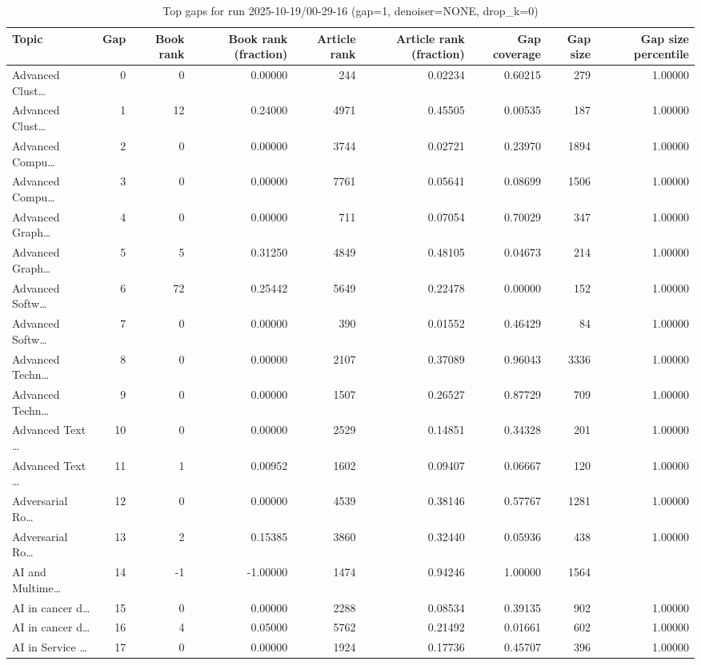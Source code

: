 \begin{table}
\caption{Top gaps for run 2025-10-19/00-29-16 (gap=1, denoiser=NONE, drop\_k=0)}
\label{tab:best_run_gap1_2025_10_19_00_29_16}
\begin{tabular}{lrrrrrrrr}
\toprule
Topic & Gap & Book rank & Book rank (fraction) & Article rank & Article rank (fraction) & Gap coverage & Gap size & Gap size percentile \\
\midrule
Advanced Clust… & 0 & 0 & 0.00000 & 244 & 0.02234 & 0.60215 & 279 & 1.00000 \\
Advanced Clust… & 1 & 12 & 0.24000 & 4971 & 0.45505 & 0.00535 & 187 & 1.00000 \\
Advanced Compu… & 2 & 0 & 0.00000 & 3744 & 0.02721 & 0.23970 & 1894 & 1.00000 \\
Advanced Compu… & 3 & 0 & 0.00000 & 7761 & 0.05641 & 0.08699 & 1506 & 1.00000 \\
Advanced Graph… & 4 & 0 & 0.00000 & 711 & 0.07054 & 0.70029 & 347 & 1.00000 \\
Advanced Graph… & 5 & 5 & 0.31250 & 4849 & 0.48105 & 0.04673 & 214 & 1.00000 \\
Advanced Softw… & 6 & 72 & 0.25442 & 5649 & 0.22478 & 0.00000 & 152 & 1.00000 \\
Advanced Softw… & 7 & 0 & 0.00000 & 390 & 0.01552 & 0.46429 & 84 & 1.00000 \\
Advanced Techn… & 8 & 0 & 0.00000 & 2107 & 0.37089 & 0.96043 & 3336 & 1.00000 \\
Advanced Techn… & 9 & 0 & 0.00000 & 1507 & 0.26527 & 0.87729 & 709 & 1.00000 \\
Advanced Text … & 10 & 0 & 0.00000 & 2529 & 0.14851 & 0.34328 & 201 & 1.00000 \\
Advanced Text … & 11 & 1 & 0.00952 & 1602 & 0.09407 & 0.06667 & 120 & 1.00000 \\
Adversarial Ro… & 12 & 0 & 0.00000 & 4539 & 0.38146 & 0.57767 & 1281 & 1.00000 \\
Adversarial Ro… & 13 & 2 & 0.15385 & 3860 & 0.32440 & 0.05936 & 438 & 1.00000 \\
AI and Multime… & 14 & -1 & -1.00000 & 1474 & 0.94246 & 1.00000 & 1564 &  \\
AI in cancer d… & 15 & 0 & 0.00000 & 2288 & 0.08534 & 0.39135 & 902 & 1.00000 \\
AI in cancer d… & 16 & 4 & 0.05000 & 5762 & 0.21492 & 0.01661 & 602 & 1.00000 \\
AI in Service … & 17 & 0 & 0.00000 & 1924 & 0.17736 & 0.45707 & 396 & 1.00000 \\

\end{tabular}
\end{table}
